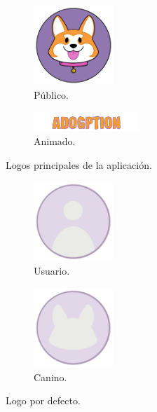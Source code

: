 \documentclass[a4paper, 12pt]{article}
\begin{document}
\begin{figure}[H]
   	\begin{subfigure}{0.48\textwidth}
		\begin{center}
			{\includegraphics[width=3cm]{logo/Logo1.png}\par}
			\caption{Público.}
		\end{center}  
	\end{subfigure}\hfill
   	\begin{subfigure}{0.48\textwidth}
		\begin{center}
			{\includegraphics[width=4cm]{logo/ADOGPTIONFIXED.png}\par}
			\caption{Animado.}
		\end{center}  
	\end{subfigure}\hfill
	\caption{Logos principales de la aplicación.}
\end{figure}

\begin{figure}[H]
   	\begin{subfigure}{0.48\textwidth}
		\begin{center}
			{\includegraphics[width=3cm]{logo/EMPTYUSER.png}\par}
			\caption{Usuario.}
		\end{center}  
	\end{subfigure}\hfill
   	\begin{subfigure}{0.48\textwidth}
		\begin{center}
			{\includegraphics[width=3cm]{logo/EMPTYDOG.png}\par}
			\caption{Canino.}
		\end{center}  
	\end{subfigure}\hfill
	\caption{Logo por defecto.}
\end{figure}
\end{document}

